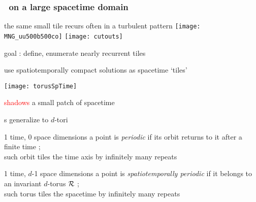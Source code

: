 \begin{frame}
    \frametitle{\KS\ on a large spacetime domain}
\begin{block}{the same small tile recurs often in a turbulent pattern}
\texttt{[image: MNG\_uu500b500co]}
\texttt{[image: cutouts]}
\end{block}
goal : define, enumerate nearly recurrent tiles
\end{frame}

\begin{frame}{use spatiotemporally compact solutions as spacetime `tiles'}
\begin{center}
\texttt{[image: torusSpTime]}
\end{center}
\textcolor{red}{shadows} a small patch of spacetime
\end{frame}

\begin{frame}{\po s generalize to $d$-tori}

\begin{block}{1 time, 0 space dimensions}
a {\statesp} point is {\em periodic} if its orbit returns to it
after a finite time \period{} ;
\\
such orbit tiles the time axis
by infinitely many repeats
\end{block}

\bigskip

\begin{block}{1 time, $d$-1 space dimensions}
 a {\statesp} point is {\em spatiotemporally periodic} if
it belongs to \\ an invariant $d$-torus ${\mathcal{R}}$ ;
\\
such torus tiles the spacetime
by infinitely many repeats
\end{block}
\end{frame}

